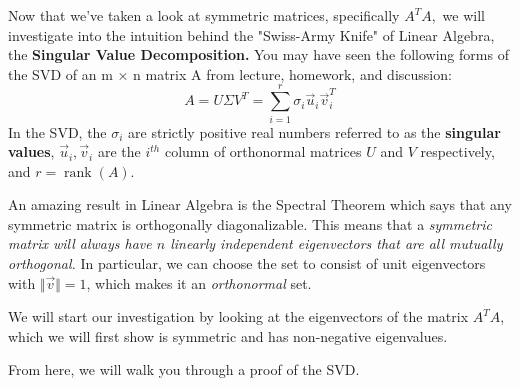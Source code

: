 


Now that we’ve taken a look at symmetric matrices, specifically $A^{T} A,$ we will investigate into the intuition behind the "Swiss-Army Knife" of Linear Algebra, the \textbf{Singular Value Decomposition.} You may have seen the following forms of the SVD of an m × n matrix A from lecture, homework, and discussion:
\begin{equation}
  A = U \Sigma V^{T} = \sum_{i=1}^{r} \sigma_{i} \vec{u}_{i} \vec{v}_{i}^T
\end{equation}
In the SVD, the $\sigma_{i}$ are strictly positive real numbers referred to as the \textbf{singular values}, $\vec{u}_{i}, \vec{v}_{i}$ are the $i^{th}$ column of orthonormal matrices $U$ and $V$ respectively, and $r = \operatorname{rank}(A)$.

An amazing result in Linear Algebra is the Spectral Theorem which says that any symmetric matrix is orthogonally diagonalizable.
This means that a \textit{symmetric matrix will always have $n$ linearly independent eigenvectors that are all mutually orthogonal.} In particular, we can choose the set to consist of unit eigenvectors with $\Vert \vec{v} \Vert = 1$, which makes it an \textit{orthonormal} set.

We will start our investigation by looking at the eigenvectors of the matrix $A^T A$, which we will first show is symmetric and has non-negative eigenvalues.

From here, we will walk you through a proof of the SVD.

